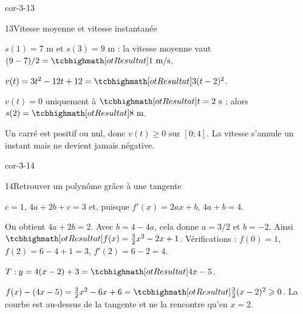 \begin{blocLivre}{cor-3-13}
\begin{corrige}{13}{Vitesse moyenne et vitesse instantanée}
\begin{questions}
\item $s(1)=7$ m et $s(3)=9$ m : la vitesse moyenne vaut $(9-7)/2=\res{1\text{ m/s}}$.
\item $v(t)=3t^2-12t+12=\res{3(t-2)^2}$.
\item $v(t)=0$ uniquement à $\res{t=2\text{ s}}$ ; alors $s(2)=\res{8\text{ m}}$.
\item Un carré est positif ou nul, donc $v(t)\geq0$ sur $[0;4]$.
La vitesse s'annule un instant mais ne devient jamais négative.
\end{questions}
\end{corrige}
\end{blocLivre}
\begin{blocLivre}{cor-3-14}
\begin{corrige}{14}{Retrouver un polynôme grâce à une tangente}
\begin{questions}
\item $c=1$, $4a+2b+c=3$ et, puisque $f'(x)=2ax+b$, $4a+b=4$.
\item On obtient $4a+2b=2$. Avec $b=4-4a$, cela donne $a=3/2$ et $b=-2$.
Ainsi $\res{f(x)=\frac32x^2-2x+1}$.
Vérifications : $f(0)=1$, $f(2)=6-4+1=3$, $f'(2)=6-2=4$.
\item $T:y=4(x-2)+3=\res{4x-5}$.
\item $f(x)-(4x-5)=\frac32x^2-6x+6=\res{\frac32(x-2)^2}\geq0$.
La courbe est au-dessus de la tangente et ne la rencontre qu'en $x=2$.
\end{questions}
\label{figlivre-r03-14-position-cor}

\end{corrige}
\end{blocLivre}
